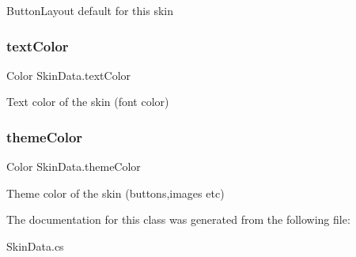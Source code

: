 Button\+Layout default for this skin 

\mbox{\label{class_skin_data_af702a25c46f12f09fbd877cf448f5a59}} 
\subsubsection{\texorpdfstring{textColor}{textColor}}
{\footnotesize\ttfamily Color Skin\+Data.\+text\+Color}



Text color of the skin (font color) 

\mbox{\label{class_skin_data_a07cca876d8c8ea7304053cc7b73f234e}} 
\subsubsection{\texorpdfstring{themeColor}{themeColor}}
{\footnotesize\ttfamily Color Skin\+Data.\+theme\+Color}



Theme color of the skin (buttons,images etc) 



The documentation for this class was generated from the following file\+:\begin{DoxyCompactItemize}
\item 
Skin\+Data.\+cs\end{DoxyCompactItemize}
